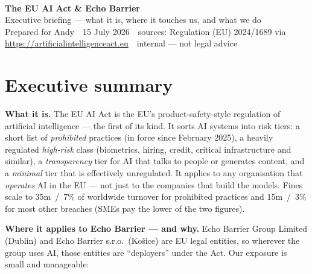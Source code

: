 \documentclass[11pt]{article}
\begin{document}
\noindent{\color{ebgreen}\rule{\linewidth}{2pt}}\\[0.35cm]
{\noindent\huge\bfseries\color{ebdark} The EU AI Act \& Echo Barrier}\\[0.2cm]
{\noindent\Large\color{ebgreen} Executive briefing --- what it is, where it touches us, and what we do}\\[0.25cm]
{\noindent\small\color{ebgrey} Prepared for Andy \,\textperiodcentered\, 15 July 2026 \,\textperiodcentered\, sources: Regulation (EU) 2024/1689 via \url{https://artificialintelligenceact.eu} \,\textperiodcentered\, internal --- not legal advice}\\[0.1cm]
\noindent{\color{ebgreen}\rule{\linewidth}{2pt}}

\section*{\color{ebgreen}Executive summary}

\textbf{What it is.} The EU AI Act is the EU's product-safety-style regulation of
artificial intelligence --- the first of its kind. It sorts AI systems into risk
tiers: a short list of \emph{prohibited} practices (in force since February 2025),
a heavily regulated \emph{high-risk} class (biometrics, hiring, credit, critical
infrastructure and similar), a \emph{transparency} tier for AI that talks to
people or generates content, and a \emph{minimal} tier that is effectively
unregulated. It applies to any organisation that \emph{operates} AI in the EU ---
not just to the companies that build the models. Fines scale to \texteuro 35m~/~7\%
of worldwide turnover for prohibited practices and \texteuro 15m~/~3\% for most other
breaches (SMEs pay the lower of the two figures).

\textbf{Where it applies to Echo Barrier --- and why.} Echo Barrier Group Limited
(Dublin) and Echo Barrier s.r.o.\ (Ko\v{s}ice) are EU legal entities, so wherever
the group uses AI, those entities are ``deployers'' under the Act. Our exposure is
small and manageable:
\end{document}
